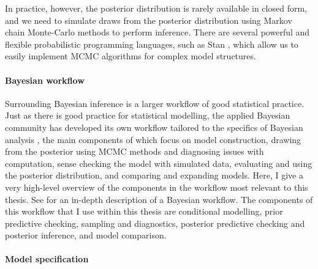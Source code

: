 In practice, however, the posterior distribution is rarely available in closed form, and we need to simulate draws from the posterior distribution using Markov chain Monte-Carlo methods to perform inference. There are several powerful and flexible probabilistic programming languages, such as Stan \citep{Stan2022}, which allow us to easily implement MCMC algorithms for complex model structures.

\paragraph*{Bayesian workflow} \label{sec:bayesian-background}

Surrounding Bayesian inference is a larger workflow of good statistical practice. Just as there is good practice for statistical modelling, the applied Bayesian community has developed its own workflow tailored to the specifics of Bayesian analysis \citep{gelman_workflow_2020}, the main components of which focus on model construction, drawing from the posterior using MCMC methods and diagnosing issues with computation, sense checking the model with simulated data, evaluating and using the posterior distribution, and comparing and expanding models. Here, I give a very high-level overview of the components in the workflow most relevant to this thesis. See \citet{gelman_workflow_2020} for an in-depth description of a Bayesian workflow. The components of this workflow that I use within this thesis are conditional modelling, prior predictive checking, sampling and diagnostics, posterior predictive checking and posterior inference, and model comparison.

\paragraph*{Model specification}

